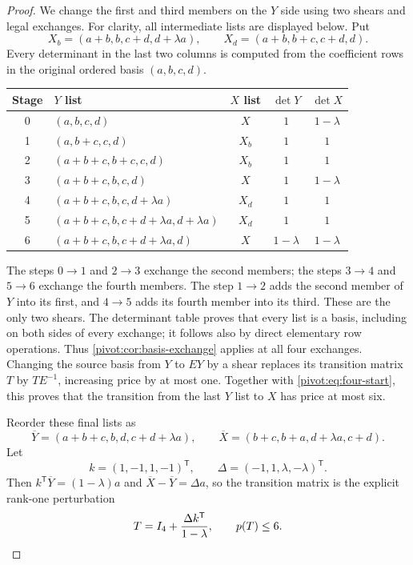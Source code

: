 \begin{proof}
We change the first and third members on the $Y$ side using two
shears and legal exchanges. For clarity, all intermediate lists
are displayed below. Put
\[
 X_b=(a+b,b,c+d,d+\lambda a),\qquad
 X_d=(a+b,b+c,c+d,d).
\]
Every determinant in the last two columns is computed from the
coefficient rows in the original ordered basis $(a,b,c,d)$.
\begin{center}
\small
\begin{tabular}{@{}c l c c c@{}}
\toprule
Stage & $Y$ list & $X$ list & $\det Y$ & $\det X$\\
\midrule
0 & $(a,b,c,d)$ & $X$ & $1$ & $1-\lambda$\\
1 & $(a,b+c,c,d)$ & $X_b$ & $1$ & $1$\\
2 & $(a+b+c,b+c,c,d)$ & $X_b$ & $1$ & $1$\\
3 & $(a+b+c,b,c,d)$ & $X$ & $1$ & $1-\lambda$\\
4 & $(a+b+c,b,c,d+\lambda a)$ & $X_d$ & $1$ & $1$\\
5 & $(a+b+c,b,c+d+\lambda a,d+\lambda a)$
  & $X_d$ & $1$ & $1$\\
6 & $(a+b+c,b,c+d+\lambda a,d)$
  & $X$ & $1-\lambda$ & $1-\lambda$\\
\bottomrule
\end{tabular}
\end{center}
The steps $0\to1$ and $2\to3$ exchange the second members;
the steps $3\to4$ and $5\to6$ exchange the fourth members.
The step $1\to2$ adds the second member of $Y$ into its first,
and $4\to5$ adds its fourth member into its third. These are
the only two shears. The determinant table proves that every list
is a basis, including on both sides of every exchange; it follows
also by direct elementary row operations. Thus
\cref{pivot:cor:basis-exchange} applies at all four exchanges.
Changing the source basis from $Y$ to $EY$ by a shear replaces its
transition matrix $T$ by $TE^{-1}$, increasing price by at most one.
Together with \cref{pivot:eq:four-start}, this proves that the
transition from the last $Y$ list to $X$ has price at most six.

Reorder these final lists as
\[
 \overline Y=(a+b+c,b,d,c+d+\lambda a),\qquad
 \overline X=(b+c,b+a,d+\lambda a,c+d).
\]
Let
\[
 k=(1,-1,1,-1)^{\mathsf T},\qquad
 \Delta=(-1,1,\lambda,-\lambda)^{\mathsf T}.
\]
Then $k^{\mathsf T}\overline Y=(1-\lambda)a$ and
$\overline X-\overline Y=\Delta a$, so the transition matrix is
the explicit rank-one perturbation
\begin{equation}\label{pivot:eq:rank-one}
 T=I_4+\frac{\Delta k^{\mathsf T}}{1-\lambda},
 \qquad p(T)\le6.
\end{equation}


\end{proof}
